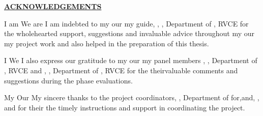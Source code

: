 \thispagestyle{empty}
\ifIDP \vspace{-1cm}\fi
\begin{center}
\Large\textbf{\underline{ACKNOWLEDGEMENTS}} \par
\end{center}

\ifPG I am \else
\ifStuNameBUsed We are \else I am \fi\fi indebted to \ifPG my \else\ifStuNameBUsed our \else my \fi\fi guide, \textbf{\printGuideNameA}, \printGuideDesigA, Department of \printGuideDeptAInSF, RVCE for the wholehearted support, suggestions and invaluable advice throughout \ifPG my \else\ifStuNameBUsed our \else my \fi\fi project work and also helped in the preparation of this thesis.\\ \par

\ifPG I \else \ifStuNameBUsed We \else I \fi\fi also express our gratitude to \ifPG my \else\ifStuNameBUsed our \else my \fi\fi  panel member\ifIDP\space\else s \fi\textbf{\printPanelMemberA}, \printPanelMemberDesigA, Department of \printPanelMemberDeptAInSF, RVCE \ifIDP \else and \textbf{\printPanelMemberB}, \printPanelMemberDesigB , Department of \printPanelMemberDeptBInSF, RVCE \fi for \ifPanelMemBUsed the \else their\fi valuable comments and suggestions during the phase evaluations. \\ \par

\ifPG My \else \ifStuNameBUsed Our \else My \fi\fi sincere thanks to the project coordinator\ifIDP\else\ifProjectMemBUsed s\fi\fi\space \textbf{\printProjectMemberA}, \printPanelMemberDesigA, Department of \printProjectMemberDeptAInSF \ifIDP \space for\space \else\ifProjectMemBUsed \ifProjectMemCUsed,\space \else\space and\space \fi\textbf{\printProjectMemberB}, \printPanelMemberDesigB,  \ifProjectMemCUsed\space and \textbf{\printProjectMemberC} \fi\fi\space for \ifProjectMemBUsed their \else the \fi\fi timely instructions and support in coordinating the project.\\ \par

